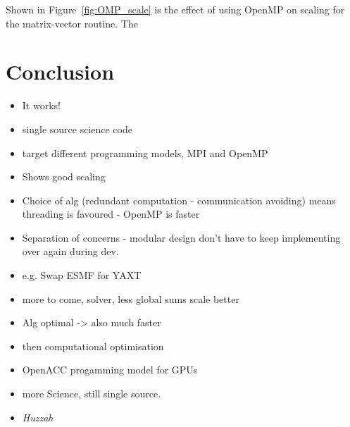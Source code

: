 \documentclass[review,times]{elsarticle}
\begin{document}
Shown in Figure~\ref{fig:OMP_scale} is the effect of using OpenMP on 
scaling for the matrix-vector routine. The 



\section{Conclusion}
\label{sec:con}
\begin{itemize}
   \item It works! 
   \item single source science code
   \item target different programming models, MPI and OpenMP
   \item Shows good scaling
   \item Choice of alg (redundant computation - communication
     avoiding) means threading is favoured - OpenMP is faster
   \item Separation of concerns - modular design don't have to keep
     implementing over again during dev.
   \item e.g. Swap ESMF for YAXT
   \item more to come, solver, less global sums scale better
   \item Alg optimal -> also much faster
   \item then computational optimisation
   \item OpenACC progamming model for GPUs
   \item more Science, still single source.
   \item {\em Huzzah}
\end{itemize}
\newpage


\end{document}
